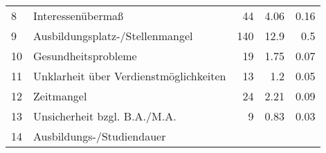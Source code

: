 \begin{longtable}{lXrrr}
     8 &
     \multicolumn{1}{X}{ Interessenübermaß   } &


       \num{44} &
       \num[round-mode=places,round-precision=2]{4,06} &
         \num[round-mode=places,round-precision=2]{0,16} \\

     9 &
     \multicolumn{1}{X}{ Ausbildungsplatz-/Stellenmangel   } &


       \num{140} &
       \num[round-mode=places,round-precision=2]{12,9} &
         \num[round-mode=places,round-precision=2]{0,5} \\

     10 &
     \multicolumn{1}{X}{ Gesundheitsprobleme   } &


       \num{19} &
       \num[round-mode=places,round-precision=2]{1,75} &
         \num[round-mode=places,round-precision=2]{0,07} \\

     11 &
     \multicolumn{1}{X}{ Unklarheit über Verdienstmöglichkeiten   } &


       \num{13} &
       \num[round-mode=places,round-precision=2]{1,2} &
         \num[round-mode=places,round-precision=2]{0,05} \\

     12 &
     \multicolumn{1}{X}{ Zeitmangel   } &


       \num{24} &
       \num[round-mode=places,round-precision=2]{2,21} &
         \num[round-mode=places,round-precision=2]{0,09} \\

     13 &
     \multicolumn{1}{X}{ Unsicherheit bzgl. B.A./M.A.   } &


       \num{9} &
       \num[round-mode=places,round-precision=2]{0,83} &
         \num[round-mode=places,round-precision=2]{0,03} \\

     14 &
     \multicolumn{1}{X}{ Ausbildungs-/Studiendauer   } &



\end{longtable}
